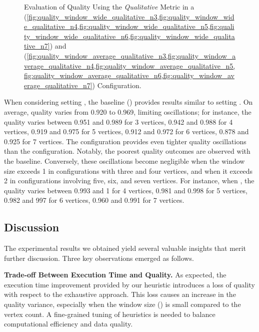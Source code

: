 \begin{figure}[H]
\begin{adjustbox}{minipage=\linewidth,scale=0.75}
    \caption{Evaluation of Quality Using the \emph{Qualitative} Metric in a \wide (\cref{fig:quality_window_wide_qualitative_n3,fig:quality_window_wide_qualitative_n4,fig:quality_window_wide_qualitative_n5,fig:quality_window_wide_qualitative_n6,fig:quality_window_wide_qualitative_n7}) and \average (\cref{fig:quality_window_average_qualitative_n3,fig:quality_window_average_qualitative_n4,fig:quality_window_average_qualitative_n5,fig:quality_window_average_qualitative_n6,fig:quality_window_average_qualitative_n7}) Configuration.}  \label{fig:quality_window_qualitative}
  \end{adjustbox}
\end{figure}

When considering setting \average, the baseline () provides results similar to setting \wide. On average, quality varies from 0.920 to 0.969, limiting oscillations; for instance, the quality varies between 0.951 and 0.989 for 3 vertices, 0.942 and 0.988 for 4 vertices, 0.919 and 0.975 for 5 vertices, 0.912 and 0.972 for 6 vertices, 0.878 and 0.925 for 7 vertices. The \average configuration provides even tighter quality oscillations than the \wide configuration. Notably, the poorest quality outcomes are observed with the baseline. Conversely, these oscillations become negligible when the window size exceeds 1 in configurations with three and four vertices, and when it exceeds 2 in configurations involving five, six, and seven vertices.  For instance, when , the quality varies between  0.993 and 1 for 4 vertices, 0.981 and 0.998 for 5 vertices, 0.982 and 997 for 6 vertices, 0.960 and 0.991 for 7 vertices.


\subsection{Discussion}
The experimental results we obtained yield several valuable insights that merit further discussion. Three key observations emerged as follows.

\vspace{0.5em}

\noindent\textbf{Trade-off Between Execution Time and Quality.} As expected, the execution time improvement provided by our heuristic introduces a loss of quality with respect to the exhaustive approach. This loss causes an increase in the quality variance, especially when the window size (\windowsize) is small compared to the vertex count. A fine-grained tuning of heuristics is needed to balance computational efficiency and data quality.


